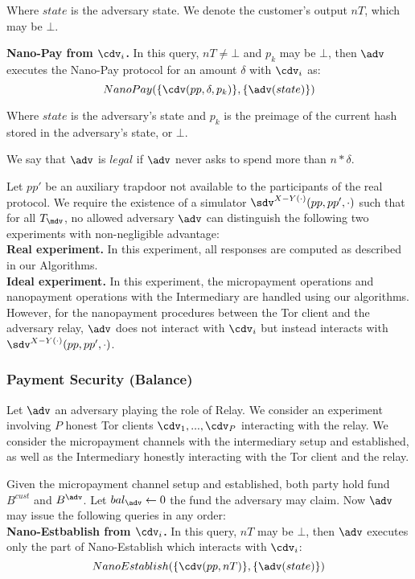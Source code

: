 Where $state$ is the adversary state. We denote the customer's output $nT$, which may be $\bot$.


\textbf{Nano-Pay from $\cdv_i$.} In this query, $nT \neq \bot$ and $p_k$ may be $\bot$, then $\adv$ executes the Nano-Pay protocol for an amount $\delta$ with $\cdv_i$ as:
$$Nano\-Pay(\{\cdv(pp, \delta, p_k)\}, \{\adv(state)\})$$

Where $state$ is the adversary's state and $p_k$ is the preimage of the current hash stored in the adversary's state, or $\bot$.

We say that $\adv$ is $legal$ if $\adv$ never asks to spend more than $n*\delta$.

Let $pp'$ be an auxiliary trapdoor not available to the participants of the real protocol. We require the existence of a simulator $\sdv^{X-Y(\cdot)}(pp, pp', \cdot)$ such that for all $T_\mdv$, no allowed adversary $\adv$ can distinguish the following two experiments with non-negligible advantage:\\
\textbf{Real experiment.} In this experiment, all responses are computed as described in our Algorithms.\\
\textbf{Ideal experiment.} In this experiment, the micropayment operations and nanopayment operations with the Intermediary are handled using our algorithms. However, for the nanopayment procedures between the Tor client and the adversary relay, $\adv$ does not interact with $\cdv_i$ but instead interacts with $\sdv^{X-Y(\cdot)}(pp,pp',\cdot)$.

\subsubsection{Payment Security (Balance)}
\label{def:balance}

Let $\adv$ an adversary playing the role of Relay. We consider an experiment involving $P$ honest Tor clients $\cdv_1,..., \cdv_P$ interacting with the relay. We consider the micropayment channels with the intermediary setup and established, as well as the Intermediary honestly interacting with the Tor client and the relay.

Given the micropayment channel setup and established, both party hold fund $B^{cust}$ and $B^{\adv}$. Let $bal_\adv \leftarrow 0$ the fund the adversary may claim. Now $\adv$ may issue the following queries in any order:\\

\textbf{Nano-Estbablish from $\cdv_i$.} In this query, $nT$ may be $\bot$, then $\adv$ executes only the part of Nano-Establish which interacts with $\cdv_i$:
$$Nano\-Establish(\{\cdv(pp, nT)\}, \{\adv(state)\})$$

